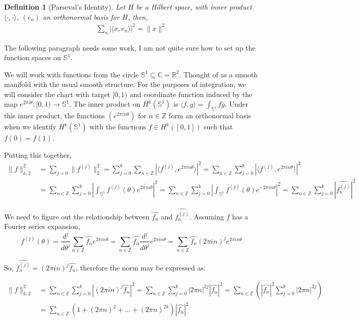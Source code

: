 \documentclass{article}
\newcommand{\C}{\mathbb{C}}
\newcommand{\Z}{\mathbb{Z}}
\newcommand{\R}{\mathbb{R}}
\newcommand{\s}{\mathbb{S}^1}
\theoremstyle{plain}
\newtheorem*{dfn}{Definition}
\theoremstyle{remark}
\begin{document}
\begin{dfn}[Parseval's Identity]
Let $H$ be a Hilbert space, with inner product $\langle\cdot, \cdot \rangle$, $(e_n)$ an orthonormal basis for $H$, then,
\begin{align*}
\sum_n |\langle x,e_n\rangle|^2 = \| x \|^2
\end{align*} 
\end{dfn}

The following paragraph needs some work, I am not quite sure how to set up the function spaces on $\s$.

We will work with functions from the circle $\s \subseteq \C = \R^2$. Thought of as a smooth manifold with the usual smooth structure. 
For the purposes of integration, we will consider the chart with target $[0,1)$ and coordinate function induced by the map $e^{2\pi i \theta}: [0,1) \to \s$. 
The inner product on $H^k(\s)$ is $\langle f, g \rangle = \int_{\s} f \overline{g}$. 
Under this inner product, the functions $(e^{2 \pi i n \theta})$ for $n \in \Z$ form an orthonormal basis when we identify $H^k(\s)$ with the functions $f \in H^k([0,1])$ such that $f(0) = f(1)$. 

Putting this together,
\begin{align*}
\| f \|_{k,2}^2 &= \sum_{j=0} \| f^{(j)}\|_{2}^2 = \sum_{j = 0}^k\sum_{n\in\Z} |\langle f^{(j)}, e^{2\pi i n \theta}\rangle |^2 = \sum_{n\in\Z}\sum_{j = 0}^k |\langle f^{(j)}, e^{2\pi i n \theta}\rangle |^2 \\
&= \sum_{n \in \Z} \sum_{j = 0}^k \left|\int_{\s} f^{(j)}(\theta)\overline{e^{2\pi i n \theta}}\right|^2 = \sum_{n \in \Z} \sum_{j = 0}^k \left|\int_{\s} f^{(j)}(\theta)e^{-2\pi i n \theta}\right|^2 = \sum_{n \in \Z} \sum_{j = 0}^k \left|\hat{f^{(j)}_n}\right|^2 
\end{align*}

We need to figure out the relationship between $\hat{f_n}$ and $\hat{f^{(j)}_n}$. Assuming $f$ has a Fourier series expansion,
\[
f^{(j)}(\theta) = \frac{d^j}{d\theta^j} \sum_{n \in \Z} \hat{f_n} e^{2 \pi i n \theta} = \sum_{n \in \Z} \hat{f_n} \frac{d^j}{d\theta^j} e^{2 \pi i n \theta} = \sum_{n \in \Z} \hat{f_n}(2\pi i n)^j e^{2 \pi i n \theta} 
\]

So, $\hat{f^{(j)}_n} = (2\pi i n)^j\hat{f_n}$, therefore the norm may be expressed as:

\begin{align*}
\| f \|_{k,2}^2 &= \sum_{n \in \Z} \sum_{j = 0}^k \left|(2\pi i n)^j \hat{f_n}\right|^2 = \sum_{n \in \Z} \sum_{j = 0}^k |2\pi n|^{2j} \left|\hat{f_n} \right|^2 = \sum_{n \in \Z}\left( \left|\hat{f_n}\right|^2 \sum_{j = 0}^k |2\pi n|^{2j}\right) \\
&= \sum_{n \in \Z} \left( 1 + (2\pi n)^2 + \dots + (2\pi n)^{2k}\right) \left|\hat{f_n} \right|^2
\end{align*}
\end{document}
